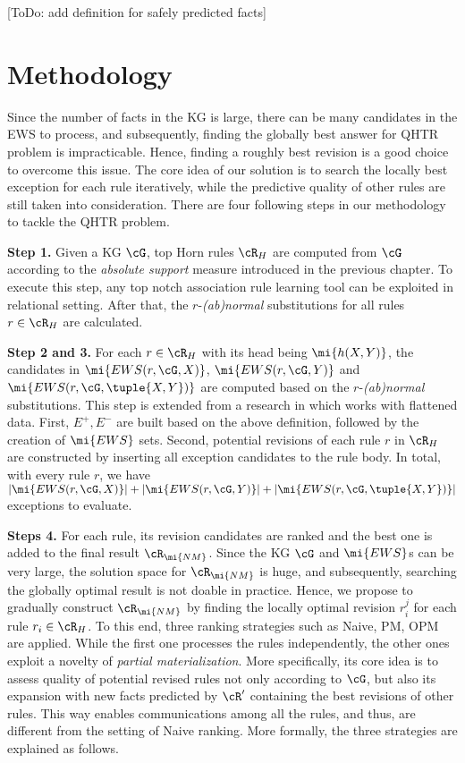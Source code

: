 [ToDo: add definition for safely predicted facts]

\vspace{-.3cm}

\section{Methodology}\label{sec:meth}

Since the number of facts in the KG is large, there can be many candidates in the EWS to process, and subsequently, finding the globally best answer for QHTR problem is impracticable. Hence, finding a roughly best revision is a good choice to overcome this issue. The core idea of our solution is to search the locally best exception for each rule iteratively, while the predictive quality of other rules are still taken into consideration. There are four following steps in our methodology to tackle the QHTR problem.
\medskip

\noindent \textbf{Step 1.} Given a KG $\cG$, top Horn rules $\cR_H$ are computed from $\cG$ according to the \textit{absolute support} measure introduced in the previous chapter. To execute this step, any top notch association rule learning tool can be exploited in relational setting. After that, the $r$-\emph{(ab)normal} substitutions for all rules $r\in \cR_H$ are calculated.
\smallskip

\noindent \textbf{Step 2 and 3.} For each $r\in \cR_H$ with its head being $\mi{h(X,Y)}$, the candidates in $\mi{EWS(r,\cG,X)}$, $\mi{EWS(r,\cG,Y)}$ and $\mi{EWS(r,\cG,\tuple{X,Y})}$ are computed based on the $r$-\emph{(ab)normal} substitutions. This step is extended from a research in \cite{iswc2016} which works with flattened data. First, $E^+, E^-$ are built based on the above definition, followed by the creation of $\mi{EWS}$ sets. Second, potential revisions of each rule $r$ in $\cR_H$ are constructed by inserting all exception candidates to the rule body. In total, with every rule $r$, we have $|\mi{EWS(r,\cG,X)}|+|\mi{EWS(r,\cG,Y)}|+|\mi{EWS(r,\cG,\tuple{X,Y})}|$ exceptions to evaluate.

\smallskip

\noindent \textbf{Steps 4.} For each rule, its revision candidates are ranked and the best one is added to the final result $\cR_{\mi{NM}}$. Since the KG $\cG$ and $\mi{EWS}$s can be very large, the solution space for $\cR_{\mi{NM}}$ is huge, and subsequently, searching the globally optimal result is not doable in practice. Hence, we propose to gradually construct $\cR_{\mi{NM}}$ by finding the locally optimal revision $r_i^{j}$ for each rule $r_i \in \cR_{H}$. To this end, three ranking strategies such as Naive, PM, OPM are applied. While the first one processes the rules independently, the other ones exploit a novelty of \emph{partial materialization}. More specifically, its core idea is to assess quality of potential revised rules not only according to $\cG$, but also its expansion with new facts predicted by $\cR'$ containing the best revisions of other rules. This way enables communications among all the rules, and thus, are different from the setting of Naive ranking. More formally, the three strategies are explained as follows.

